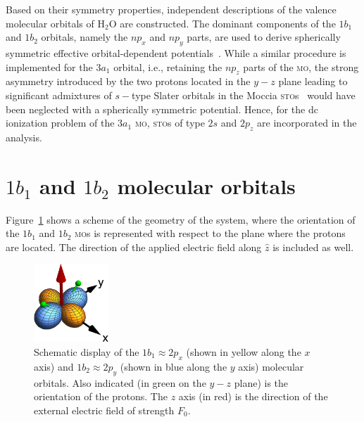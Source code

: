 Based on their symmetry properties, independent descriptions of the
valence molecular orbitals of H$_{2}$O are constructed. The dominant
components of the $1b_{1}$ and $1b_{2}$ orbitals, namely the $np_{x}$
and $np_{y}$ parts, are used to derive spherically symmetric effective
orbital-dependent potentials~\cite{sarias_2016}. While a similar
procedure is implemented for the $3a_{1}$ orbital, i.e., retaining the
$np_{z}$ parts of the \textsc{mo}, the strong asymmetry introduced by
the two protons located in the $y-z$ plane leading to significant
admixtures of $s-$type Slater orbitals in the Moccia
\textsc{sto}s~\cite{Moccia_1964} would have been neglected with a
spherically symmetric potential. Hence, for the dc ionization problem
of the $3a_{1}$ \textsc{mo}, \textsc{sto}s of type $2s$ and $2p_{z}$
are incorporated in the analysis.



\section{$1b_{1}$ and $1b_{2}$ molecular orbitals}
\label{ch:1b1_1b2}

Figure~\ref{fig:h2o_1b1_1b2} shows a scheme of the geometry of the
system, where the orientation of the $1b_{1}$ and $1b_{2}$
\textsc{mo}s is represented with respect to the plane where the
protons are located. The direction of the applied electric field along
$\hat{z}$ is included as well.

\begin{figure}
  \centering
  \includegraphics[width=0.25\textwidth]{figures/ch_H2O/orbitals.eps}
  \caption{Schematic display of the $1b_{1}\approx 2p_{x}$ (shown in
    yellow along the $x$ axis) and $1b_{2}\approx 2p_{y}$ (shown in
    blue along the $y$ axis) molecular orbitals. Also indicated (in
    green on the $y-z$ plane) is the orientation of the protons. The
    $z$ axis (in red) is the direction of the external electric field
    of strength $F_{0}$.}
  \label{fig:h2o_1b1_1b2}
\end{figure}


